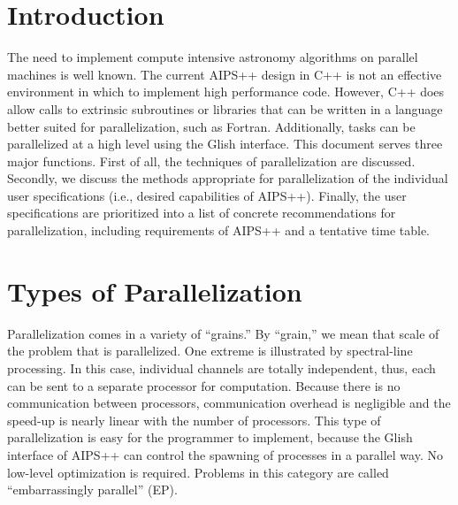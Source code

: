 
%





\section{Introduction}

The need to implement compute intensive astronomy algorithms on
parallel machines is well known.  The current AIPS++ design in C++ is
not an effective environment in which to implement high performance
code.  However, C++ does allow calls to extrinsic subroutines or
libraries that can be written in a language better suited for
parallelization, such as Fortran.  Additionally, tasks can be
parallelized at a high level using the Glish interface.  This document
serves three major functions.  First of all, the techniques of
parallelization are discussed.  Secondly, we discuss the methods
appropriate for parallelization of the individual user specifications
(i.e., desired capabilities of AIPS++).  Finally, the user
specifications are prioritized into a list of concrete recommendations
for parallelization, including requirements of AIPS++ and a tentative
time table.

\section{Types of Parallelization}

Parallelization comes in a variety of ``grains.''  By ``grain,'' we
mean that scale of the problem that is parallelized.  One extreme is
illustrated by spectral-line processing.  In this case, individual
channels are totally independent, thus, each can be sent to a separate
processor for computation.  Because there is no communication between
processors, communication overhead is negligible and the speed-up is
nearly linear with the number of processors.  This type of
parallelization is easy for the programmer to implement, because the
Glish interface of AIPS++ can control the spawning of processes in a
parallel way.  No low-level optimization is required.  Problems in
this category are called ``embarrassingly parallel'' (EP).


